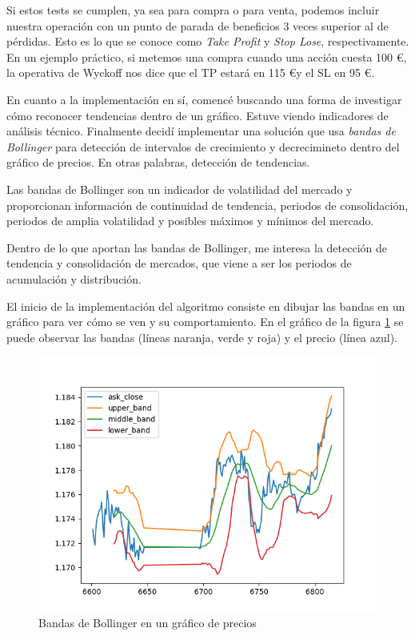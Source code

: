 Si estos tests se cumplen, ya sea para compra o para venta, podemos incluir nuestra operación con un punto de parada de beneficios 3 veces superior al de pérdidas. Esto es lo que se conoce como \textit{Take Profit} y \textit{Stop Lose}, respectivamente. En un ejemplo práctico, si metemos una compra cuando una acción cuesta 100 \euro, la operativa de Wyckoff nos dice que el TP estará en 115 \euro y el SL en 95 \euro.\newline

En cuanto a la implementación en sí, comencé buscando una forma de investigar cómo reconocer tendencias dentro de un gráfico. Estuve viendo indicadores de análisis técnico. Finalmente decidí implementar una solución que usa \textit{bandas de Bollinger} para detección de intervalos de crecimiento y decrecimineto dentro del gráfico de precios. En otras palabras, detección de tendencias.\newline

Las bandas de Bollinger son un indicador de volatilidad del mercado y proporcionan información de continuidad de tendencia, periodos de consolidación, periodos de amplia volatilidad y posibles máximos y mínimos del mercado.\newline

Dentro de lo que aportan las bandas de Bollinger, me interesa la detección de tendencia y consolidación de mercados, que viene a ser los periodos de acumulación y distribución. \newline

El inicio de la implementación del algoritmo consiste en dibujar las bandas en un gráfico para ver cómo se ven y su comportamiento. En el gráfico de la figura \ref{bandas_bollinger} se puede observar las bandas (líneas naranja, verde y roja) y el precio (línea azul).\newline

\begin{figure}[h]
	\includegraphics[width=1\textwidth]{imagenes/bandas_bollinger.png}
	\caption{Bandas de Bollinger en un gráfico de precios} \label{bandas_bollinger}
\end{figure}

